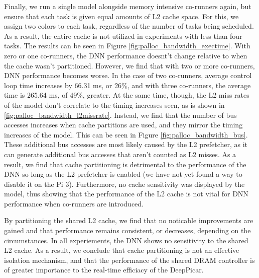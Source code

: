 Finally, we run a single model alongside memory intensive co-runners 
again, but ensure that each task is given equal amounts of L2 cache space.
For this, we assign two colors to each task, regardless of the number of
tasks being scheduled. As a result, the entire cache is not utilized in
experiments with less than four tasks. The results can be seen in Figure
\ref{fig:palloc_bandwidth_exectime}. With zero or one co-runners, the DNN
performance doesnt't change relative to when the cache wasn't partitioned.
However, we find that with two or more co-runners, DNN performance becomes
worse. In the case of two co-runners, average control loop time increases
by 66.31 ms, or 26\%, and with three co-runners, the average time
is 265.64 ms, of 49\%, greater.
At the same time, though, the L2 miss rates of the model don't correlate 
to the timing increases seen, as is shown in 
\ref{fig:palloc_bandwidth_l2missrate}. Instead, we find that the number
of bus accesses increases when cache partitions are used, and they mirror
the timing increases of the model. This can be seen in Figure 
\ref{fig:palloc_bandwidth_bus}. These additional bus accesses are
most likely caused by the L2 prefetcher, as it can generate additional bus
accesses that aren't counted as L2 misses. As a result, we find that cache
partitioning is detrimental to the performance of the DNN so long as the 
L2 prefetcher is enabled (we have not yet found a way to disable it on
the Pi 3). Furthermore, no cache sensitivity was displayed by the model,
thus showing that the performance of the L2 cache is not vital for DNN 
performance when co-runners are introduced.

By partitioning the shared L2 cache, we find that no noticable 
improvements are gained and that performance remains consistent, or 
decreases, depending on the circumstances. In all experiements, the DNN
shows no sensitivity to the shared L2 cache. As a result, we conclude 
that cache partitioning is not an effective isolation mechanism, and that 
the performance of the shared DRAM controller is of greater importance 
to the real-time efficiacy of the DeepPicar.
